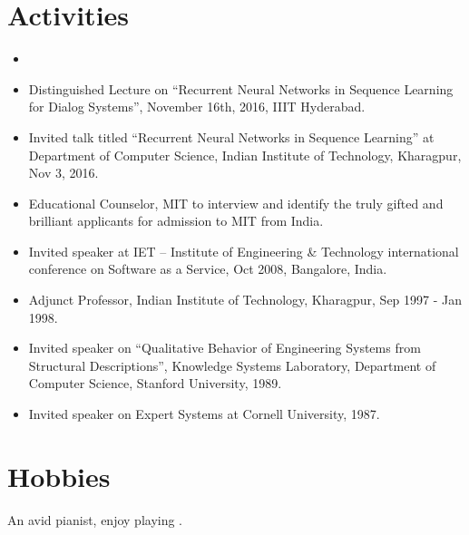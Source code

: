 \documentclass[article, a4paper, 11pt, twoside, openright, english]{memoir}
\begin{document}
\section*{Activities}
\begin{itemize}[left=0pt, itemsep=1pt]
    \item {}
    \item Distinguished Lecture on “Recurrent Neural Networks in Sequence Learning for Dialog Systems”, November 16th, 2016, IIIT Hyderabad.
    \item Invited talk titled “Recurrent Neural Networks in Sequence Learning” at Department of Computer Science, Indian Institute of Technology, Kharagpur, Nov 3, 2016.
    \item Educational Counselor, MIT to interview and identify the truly gifted and brilliant applicants for admission to MIT from India.
    \item Invited speaker at IET – Institute of Engineering \& Technology international conference on Software as a Service, Oct 2008, Bangalore, India.
    \item Adjunct Professor, Indian Institute of Technology, Kharagpur, Sep 1997 - Jan 1998.
    \item Invited speaker on “Qualitative Behavior of Engineering Systems from Structural Descriptions”, Knowledge Systems Laboratory, Department of Computer Science, Stanford University, 1989.
    \item Invited speaker on Expert Systems at Cornell University, 1987.
\end{itemize}

\vspace{-7mm} 
\section*{Hobbies}
An avid pianist, enjoy playing .
\end{document}

